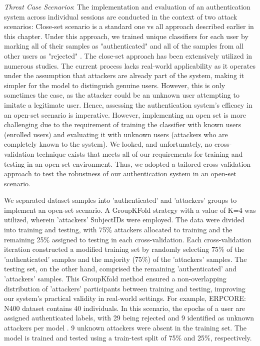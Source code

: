 \textit{Threat Case Scenarios}: The implementation and evaluation of an authentication system across individual sessions are conducted in the context of two attack scenarios: Close-set scenario is a standard one vs all approach described earlier in this chapter. Under this approach,  
we trained unique classifiers for each user by marking all of their samples as "authenticated" and all of the samples from all other users as "rejected" \cite{arias2023performance}. The close-set approach has been extensively utilized in numerous studies. The current process lacks real-world applicability as it operates under the assumption that attackers are already part of the system, making it simpler for the model to distinguish genuine users. However, this is only sometimes the case, as the attacker could be an unknown user attempting to imitate a legitimate user. Hence, assessing the authentication system's efficacy in an open-set scenario is imperative. However, implementing an open set is more challenging due to the requirement of training the classifier with known users (enrolled users) and evaluating it with unknown users (attackers who are completely known to the system). We looked, and unfortunately, no cross-validation technique exists that meets all of our requirements for training and testing in an open-set environment. Thus, we adopted a tailored cross-validation approach to test the robustness of our authentication system in an open-set scenario. 

We separated dataset samples into 'authenticated' and 'attackers' groups to implement an open-set scenario. A GroupKFold strategy with a value of K=4 was utilized, wherein 'attackers' SubjectIDs were employed. The data were divided into training and testing, with 75$\%$ attackers allocated to training and the remaining 25$\%$ assigned to testing in each cross-validation. Each cross-validation iteration constructed a modified training set by randomly selecting 75$\%$ of the 'authenticated' samples and the majority (75$\%$) of the 'attackers' samples. The testing set, on the other hand, comprised the remaining 'authenticated' and 'attackers' samples. This GroupKfold method ensured a non-overlapping distribution of 'attackers' participants between training and testing, improving our system's practical validity in real-world settings. For example, ERPCORE: N400 dataset contains 40 individuals. In this scenario, the epochs of a user are assigned authenticated labels, with 29 being rejected and 9 identified as unknown attackers per model \cite{arias2023performance}.  9 unknown attackers were absent in the training set. The model is trained and tested using a train-test split of 75$\%$ and 25$\%$, respectively. 


